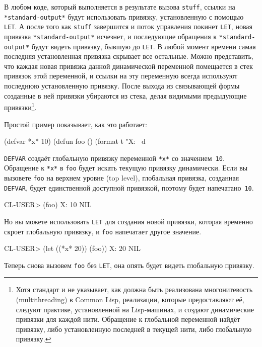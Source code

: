 В любом коде, который выполняется в результате вызова \lstinline{stuff}, ссылки на \lstinline{*standard-output*}
будут использовать привязку, установленную с помощью \lstinline{LET}. А после того как \lstinline{stuff}
завершится и поток управления покинет \lstinline{LET}, новая привязка \lstinline{*standard-output*}
исчезнет, и последующие обращения к \lstinline{*standard-output*} будут видеть привязку, бывшую до
\lstinline{LET}. В любой момент времени самая последняя установленная привязка скрывает все
остальные. Можно представить, что каждая новая привязка данной динамической переменной
помещается в стек привязок этой переменной, и ссылки на эту переменную всегда используют
последнюю установленную привязку. После выхода из связывающей формы созданные в ней
привязки убираются из стека, делая видимыми предыдующие привязки\footnote{Хотя стандарт и
  не указывает, как должна быть реализована многонитевость (multithreading) в Common Lisp,
  реализации, которые предоставляют её, следуют практике, установленной на Lisp-машинах, и
  создают динамические привязки для каждой нити. Обращение к глобальной переменной найдёт
  привязку, либо установленную последней в текущей нити, либо глобальную привязку.}.

Простой пример показывает, как это работает:

\begin{myverb}
(defvar *x* 10)
(defun foo () (format t "X: ~d~%
\end{myverb}

\lstinline{DEFVAR} создаёт глобальную привязку переменной \lstinline{*x*} со значением~\lstinline{10}. Обращение к
\lstinline{*x*} в \lstinline{foo} будет искать текущую привязку динамически. Если вы вызовете \lstinline{foo} на верхнем
уровне (top level), глобальная привязка, созданная \lstinline{DEFVAR}, будет
единственной доступной привязкой, поэтому будет напечатано~\lstinline{10}.

\begin{myverb}
CL-USER> (foo)
X: 10
NIL
\end{myverb}

Но вы можете использовать \lstinline{LET} для создания новой привязки, которая временно
скроет глобальную привязку, и \lstinline{foo} напечатает другое значение.

\begin{myverb}
CL-USER> (let ((*x* 20)) (foo))
X: 20
NIL
\end{myverb}

Теперь снова вызовем \lstinline{foo} без \lstinline{LET}, она опять будет видеть глобальную
привязку.

